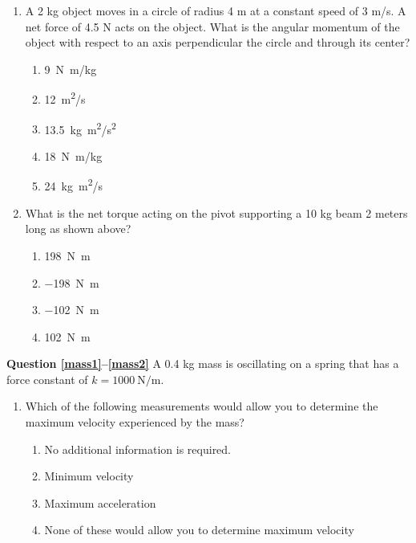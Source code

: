 \documentclass[11pt]{article}
\begin{document}
\begin{multicols}{2}
\begin{enumerate}[leftmargin=18pt,resume]
  \item A 2 kg object moves in a circle of radius 4 m at a constant speed of
    3 m/s. A net force of 4.5 N acts on the object. What is the angular
    momentum of the object with respect to an axis perpendicular the circle
    and through its center?
    \begin{enumerate}[nosep,leftmargin=18pt,label=(\Alph*)]
    \item\SI{9}{N.m/kg}
    \item\SI{12}{m^2/s}
    \item\SI{13.5}{kg.m^2/s^2}
    \item\SI{18}{N.m/kg}
    \item\SI{24}{kg.m^2/s}
    \end{enumerate}
    \vspace{.7in}
    
    \begin{center}
    \end{center}
    
  \item What is the net torque acting on the pivot supporting a 10 kg beam 2
    meters long as shown above?
    \begin{enumerate}[nosep,leftmargin=18pt,label=(\Alph*)]
    \item\SI{198}{\newton.\metre}
    \item\SI{-198}{\newton.\metre}
    \item\SI{-102}{\newton.\metre}
    \item\SI{102}{\newton.\metre}
    \end{enumerate}
  \end{enumerate}   
  \columnbreak
  
  \textbf{Question \ref{mass1}--\ref{mass2}} A 0.4 kg mass is oscillating on a
  spring that has a force constant of $k=\SI{1000}{\newton\per\metre}$.
  \begin{enumerate}[leftmargin=18pt,resume]
  \item Which of the following measurements would allow you to determine the
    maximum velocity experienced by the mass?
    \label{mass1}
    \begin{enumerate}[nosep,leftmargin=18pt,label=(\Alph*)]
    \item No additional information is required.
    \item Minimum velocity
    \item Maximum acceleration
    \item None of these would allow you to determine maximum velocity
    \end{enumerate}
    

\end{enumerate}
\end{multicols}
\end{document}
